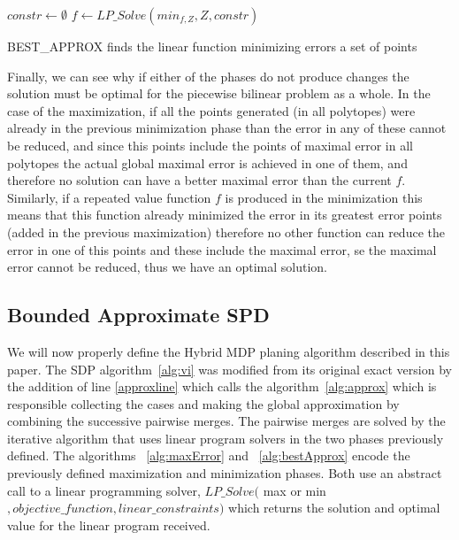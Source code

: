 \begin{algorithm}[!ht]
\dontprintsemicolon
{}
$constr \gets \emptyset$\;
\;
$f \gets LP\_Solve(min_{f,Z}, Z, constr)$\;	
\;
\caption{{\sc BEST\_APPROX} finds the linear function minimizing errors a set of points}
\label{alg:bestApprox}
\end{algorithm}


Finally, we can see why if either of the phases do not produce changes the solution must be optimal for the piecewise bilinear problem as a whole. In the case of the maximization, if all the points generated (in all polytopes) were already in the previous minimization phase than the error in any of these cannot be reduced, and since this points include the points of maximal error in all polytopes the actual global maximal error is achieved in one of them, and therefore no solution can have a better maximal error than the current $f$. Similarly, if a repeated value function $f$ is produced in the minimization this means that this function already minimized the error in its greatest error points (added in the previous maximization) therefore no other function can reduce the error in one of this points and these include the maximal error, se the maximal error cannot be reduced, thus we have an optimal solution.

\subsection{Bounded Approximate SPD}
We will now properly define the Hybrid MDP planing algorithm described in this paper. The SDP algorithm~\ref{alg:vi} was modified from its original exact version by the addition of line \ref{approxline} which calls the algorithm~\ref{alg:approx} which is responsible collecting the cases and making the global approximation by combining the successive pairwise merges. The pairwise merges are solved by the iterative algorithm that uses linear program solvers in the two phases previously defined. The algorithms ~\ref{alg:maxError} and ~\ref{alg:bestApprox} encode the previously defined maximization and minimization phases. Both use an abstract call to a linear programming solver, $LP\_Solve($ max or min$, objective\_function, linear\_constraints)$ which returns the solution and optimal value for the linear program received.




